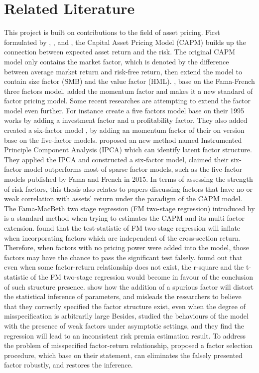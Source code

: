 	\section{Related Literature}\label{Literature}
This project is built on contributions to the field of asset pricing.
First formulated by , , and , the Capital Asset Pricing Model (CAPM) builds up the connection between expected asset return and the risk.
The original CAPM model only contains the market factor, which is denoted by the difference between average market return and risk-free return, then extend the model to contain size factor (SMB) and the value factor (HML).
, base on the Fama-French three factors model, added the momentum factor and makes it a new standard of factor pricing model.
Some recent researches are attempting to extend the factor model even further.
For instance  create a five factors model base on their 1995 works by adding a investment factor and a profitability factor.
They also added created a six-factor model \cite{Fama2018}, by adding an momentum factor of their on version base on the five-factor models.
 proposed an new method named Instrumented Principle Component Analysis (IPCA) which can identify latent factor structure.
They applied the IPCA and constructed a six-factor model, claimed their six-factor model outperforms most of sparse factor models, such as the five-factor models published by Fama and French in 2015.
In terms of assessing the strength of risk factors, this thesis also relates to papers discussing factors that have no or weak correlation with assets' return under the paradigm of the CAPM model.
The Fama-MacBeth two stage regression (FM two-stage regression) introduced by  is a standard method when trying to estimates the CAPM and its multi factor extension. 
 found that the test-statistic of FM two-stage regression will inflate when incorporating factors which are independent of the cross-section return.
Therefore, when factors with no pricing power were added into the model, those factors may have the chance to pass the significant test falsely.
 found out that even when some factor-return relationship does not exist, the r-square and the t-statistic of the FM two-stage regression would become in favour of the conclusion of such structure presence. 
 show how the addition of a spurious factor will distort the statistical inference of parameters, and misleads the researchers to believe that they correctly specified the factor structure exist, even when the degree of misspecification is arbitrarily large
Besides,  studied the behaviours of the model with the presence of weak factors under asymptotic settings, and they find the regression will lead to an inconsistent risk premia estimation result.
To address the problem of misspecified factor-return relationship,  proposed a factor selection procedure, which base on their statement, can eliminates the falsely presented factor robustly, and restores the inference. 
	
